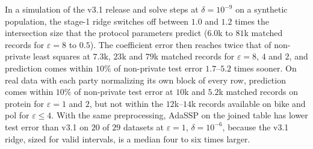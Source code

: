 %
%

In a simulation of the v3.1 release and solve steps at $\delta = 10^{-9}$ on a synthetic population, the stage-1 ridge switches off between $1.0$ and $1.2$ times the intersection size that the protocol parameters predict ($6.0$k to $81$k matched records for $\varepsilon = 8$ to $0.5$). The coefficient error then reaches twice that of non-private least squares at $7.3$k, $23$k and $79$k matched records for $\varepsilon = 8$, $4$ and $2$, and prediction comes within $10\%$ of non-private test error $1.7$--$5.2$ times sooner. On real data with each party normalizing its own block of every row, prediction comes within $10\%$ of non-private test error at $10$k and $5.2$k matched records on protein for $\varepsilon = 1$ and $2$, but not within the $12$k--$14$k records available on bike and pol for $\varepsilon \le 4$. With the same preprocessing, AdaSSP on the joined table has lower test error than v3.1 on $20$ of $29$ datasets at $\varepsilon = 1$, $\delta = 10^{-6}$, because the v3.1 ridge, sized for valid intervals, is a median four to six times larger.

